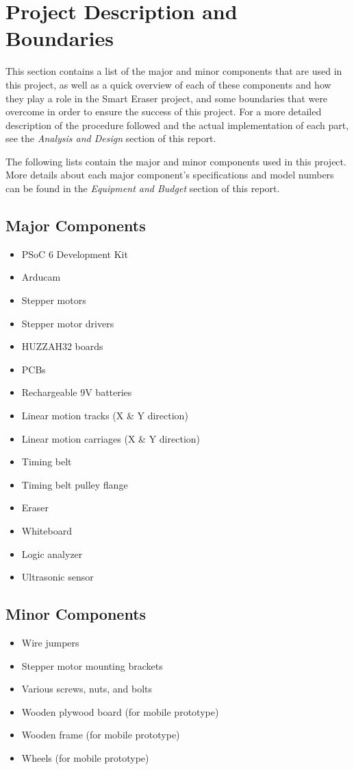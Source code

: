 \section{Project Description and Boundaries}
This section contains a list of the major and minor components that are used in this project, as well as a quick overview of each of these components and how they play a role in the Smart Eraser project, and some boundaries that were overcome in order to ensure the success of this project. For a more detailed description of the procedure followed and the actual implementation of each part, see the \textit{Analysis and Design} section of this report. \par
\setlength{\parindent}{2.5ex}The following lists contain the major and minor components used in this project. More details about each major component's specifications and model numbers can be found in the \textit{Equipment and Budget} section of this report.


\subsection{Major Components}
\begin{itemize}
	\item PSoC 6 Development Kit
	\item Arducam
	\item Stepper motors
	\item Stepper motor drivers
	\item HUZZAH32 boards
	\item PCBs
	\item Rechargeable 9V batteries
	\item Linear motion tracks (X \& Y direction)
	\item Linear motion carriages (X \& Y direction)
	\item Timing belt
	\item Timing belt pulley flange
	\item Eraser
	\item Whiteboard
	\item Logic analyzer
	\item Ultrasonic sensor
\end{itemize}

\subsection{Minor Components}
\begin{itemize}
	\item Wire jumpers
	\item Stepper motor mounting brackets
	\item Various screws, nuts, and bolts
	\item Wooden plywood board (for mobile prototype)
	\item Wooden frame (for mobile prototype)
	\item Wheels (for mobile prototype)
\end{itemize}

